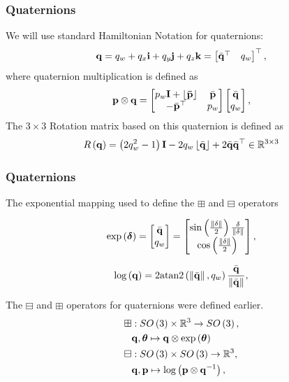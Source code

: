 \documentclass{beamer}
\begin{document}
\begin{frame}
\frametitle{Quaternions}
We will use standard Hamiltonian Notation for quaternions:
\begin{equation}
{\bf q}=q_{w}+q_{x}{\bf i}+q_{y}{\bf j}+q_{z}{\bf k}=\begin{bmatrix}\bar{{\bf q}}^{\top} & q_{w}\end{bmatrix}^{\top},
\end{equation}
where quaternion multiplication is defined as
\begin{equation}
{\bf p}\otimes{\bf q}=\begin{bmatrix}p_{w}{\bf I+\left\lfloor \bar{{\bf p}}\right\rfloor } & \bar{{\bf p}}\\
-\bar{{\bf p}}^{\top} & p_{w}
\end{bmatrix}\begin{bmatrix}\bar{{\bf q}}\\
q_{w}
\end{bmatrix},
\end{equation}
The $3\times3$ Rotation matrix based on this quaternion is defined
as
\begin{equation}
R\left({\bf q}\right)=\left(2q_{w}^{2}-1\right){\bf I}-2q_{w}\left\lfloor \bar{{\bf q}}\right\rfloor +2\bar{{\bf q}}\bar{{\bf q}}^{\top}\in\mathbb{R}^{3\times3}
\end{equation}
\end{frame}


\begin{frame}
\frametitle{Quaternions}
The exponential mapping used to define the $\boxplus$ and $\boxminus$
operators 

\begin{equation}
\exp\left(\boldsymbol{\delta}\right)=\begin{bmatrix}\bar{{\bf q}}\\
q_{w}
\end{bmatrix}=\begin{bmatrix}\sin\left(\frac{\lVert\delta\rVert}{2}\right)\frac{\delta}{\lVert\delta\rVert}\\
\cos\left(\frac{\lVert\delta\rVert}{2}\right)
\end{bmatrix},
\end{equation}


\begin{equation}
\log\left({\bf q}\right)=2\mathrm{atan2}\left(\left\Vert \bar{{\bf q}}\right\Vert ,q_{w}\right)\frac{\bar{{\bf q}}}{\left\Vert \bar{{\bf q}}\right\Vert },
\end{equation}


The $\boxminus$ and \textbf{$\boxplus$ }operators for quaternions
were defined earlier.
\begin{eqnarray}
\boxplus & :SO\left(3\right)\times\mathbb{R}^{3}\rightarrow SO\left(3\right),\\
 & {\bf q},\boldsymbol{\theta}\mapsto{\bf q}\otimes\exp\left(\boldsymbol{\theta}\right)\\
\boxminus & :SO\left(3\right)\times SO\left(3\right)\rightarrow\mathbb{R}^{3},\\
 & {\bf q},{\bf p}\mapsto\log\left({\bf p}\otimes{\bf q}^{-1}\right),
\end{eqnarray}
\end{frame}
\end{document}
